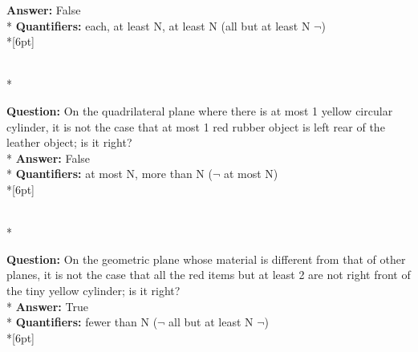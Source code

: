 \begin{figure*}
\begin{minipage}{0.48\textwidth}
\begin{minipage}[t][2.2cm][t]{1\textwidth}
      \textbf{Answer:} False \\*
      \textbf{Quantifiers:} each, at least N, at least N (all but at least N $\neg$) \\*[6pt]
    \end{minipage}\\*
    \begin{minipage}[t][2.2cm][t]{1\textwidth}
      \footnotesize
      \textbf{Question:}  On the quadrilateral plane where there is at most 1 yellow circular cylinder, it is not the case that at most 1 red rubber object is left rear of the leather object; is it right? \\*
      \textbf{Answer:}  False \\*
      \textbf{Quantifiers:}  at most N, more than N ($\neg$ at most N) \\*[6pt]
    \end{minipage}\\*
    \begin{minipage}[t][2.2cm][t]{1\textwidth}
      \footnotesize
      \textbf{Question:} On the geometric plane whose material is different from that of other planes, it is not the case that all the red items but at least 2 are not right front of the tiny yellow cylinder; is it right? \\*
      \textbf{Answer:} True \\*
      \textbf{Quantifiers:} fewer than N ($\neg$ all but at least N $\neg$) \\*[6pt]
    \end{minipage}
  \end{minipage}
  \vspace{0.2cm}
  

\end{figure*}
